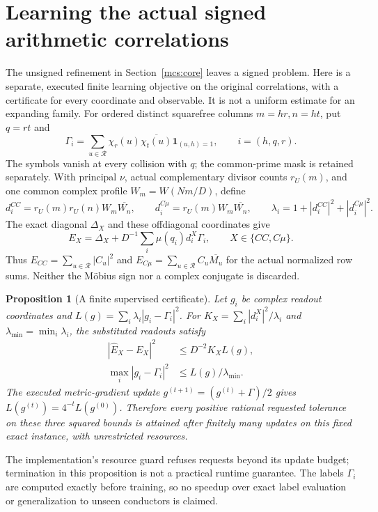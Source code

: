 \documentclass[11pt]{article}
\newtheorem{proposition}[theorem]{Proposition}
\theoremstyle{definition}\newtheorem{definition}[theorem]{Definition}
\theoremstyle{remark}\newtheorem{remark}[theorem]{Remark}
\begin{document}
\section{Learning the actual signed arithmetic correlations}\label{arl:core}
The unsigned refinement in Section~\ref{mcs:core} leaves a signed problem.
Here is a separate, executed finite learning objective on the original
correlations, with a certificate for every coordinate and observable.
It is not a uniform estimate for an expanding family.
For ordered distinct squarefree columns $m=hr,n=ht$, put $q=rt$ and
\[
 \Gamma_i=\sum_{u\in\mathcal R}\chi_r(u)\overline{\chi_t(u)}
                         \mathbf1_{(u,h)=1},\qquad i=(h,q,r).
\]
The symbols vanish at every collision with $q$; the common-prime mask is
retained separately. With principal $\nu$, actual complementary divisor counts
$r_U(m)$, and one common complex profile $W_m=W(Nm/D)$, define
\[
 d_i^{CC}=r_U(m)r_U(n)W_m\overline{W_n},\qquad
 d_i^{C\mu}=r_U(m)W_m\overline{W_n},\qquad
 \lambda_i=1+|d_i^{CC}|^2+|d_i^{C\mu}|^2.
\]
The exact diagonal $\Delta_X$ and these offdiagonal coordinates give
\begin{equation}\label{arl:observable}
 E_X=\Delta_X+D^{-1}\sum_i\mu(q_i)d_i^X\Gamma_i,
       \qquad X\in\{CC,C\mu\}.
\end{equation}
Thus $E_{CC}=\sum_{u\in\mathcal R}|C_u|^2$ and
$E_{C\mu}=\sum_{u\in\mathcal R}C_u\overline{M_u}$ for the actual normalized
row sums. Neither the M\"obius sign nor a complex conjugate is discarded.

\begin{proposition}[A finite supervised certificate]\label{arl:certificate}
Let $g_i$ be complex readout coordinates and
$L(g)=\sum_i\lambda_i|g_i-\Gamma_i|^2$.
For $K_X=\sum_i|d_i^X|^2/\lambda_i$ and
$\lambda_{\min}=\min_i\lambda_i$, the substituted readouts satisfy
\begin{align*}
 |\widehat E_X-E_X|^2&\le D^{-2}K_X L(g),\\
 \max_i|g_i-\Gamma_i|^2&\le L(g)/\lambda_{\min}.
\end{align*}
The executed metric-gradient update $g^{(t+1)}=(g^{(t)}+\Gamma)/2$
gives $L(g^{(t)})=4^{-t}L(g^{(0)})$. Therefore every positive rational
requested tolerance on these three squared bounds is attained after finitely
many updates on this fixed exact instance, with unrestricted resources.
\end{proposition}
The implementation's resource guard refuses requests beyond its update budget;
termination in this proposition is not a practical runtime guarantee.
The labels $\Gamma_i$ are computed exactly before training, so no speedup over
exact label evaluation or generalization to unseen conductors is claimed.
\end{document}
